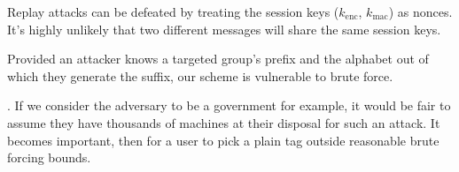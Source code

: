 Replay attacks can be defeated by treating the session keys
($k_{\mathrm{enc}}$, $k_{\mathrm{mac}}$) as nonces. It's highly unlikely
that two different messages will share the same session keys.


%
Provided an attacker knows a targeted group's prefix and the alphabet
out of which they generate the suffix, our scheme is vulnerable to brute
force.

. If we consider the adversary
to be a government for example, it would be fair to assume they have
thousands of machines at their disposal for such an attack. It becomes
important, then for a user to pick a plain tag outside reasonable brute
forcing bounds.


%


